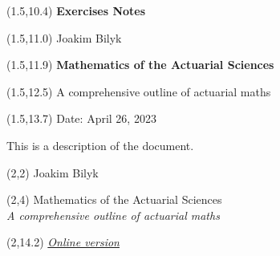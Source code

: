 \documentclass[a4paper,12pt,openany]{book}
\begin{document}
\thispagestyle{empty}

\begin{textblock}{12}(1.5,10.4) \noindent\fontsize{20}{20}\selectfont \textbf{Exercises Notes}
\end{textblock}

\begin{textblock}{12}(1.5,11.0) \noindent\fontsize{14}{14}\selectfont Joakim Bilyk
\end{textblock}

\begin{textblock}{12}(1.5,11.9)
\noindent\fontsize{20}{20}\selectfont \textbf{Mathematics of the Actuarial Sciences}
\end{textblock}

\begin{textblock}{12}(1.5,12.5)
    \noindent\fontsize{14}{14}\selectfont A comprehensive outline of actuarial maths
\end{textblock}

\begin{textblock}{12}(1.5,13.7)
\noindent\fontsize{11}{11}\selectfont Date: April 26, 2023
\end{textblock}

\hspace{1pt}
\newpage

\onehalfspacing
\thispagestyle{empty}
\noindent

This is a description of the document.

\newpage

\thispagestyle{empty}

\begin{textblock}{12}(2,2)
\noindent\fontsize{20}{20}\selectfont Joakim Bilyk
\end{textblock}

\begin{textblock}{12}(2,4)
\noindent\fontsize{35pt}{40pt}\selectfont Mathematics of the Actuarial Sciences\\
\fontsize{20pt}{40pt}\selectfont \emph{A comprehensive outline of actuarial maths}
\end{textblock}

\begin{textblock}{12}(2,14.2)
\noindent\fontsize{16}{11}\selectfont \emph{\href{https://joakim-bilyk.github.io/books/exercises}{Online version}}
\end{textblock}

\hspace{1pt}
\newpage
\end{document}
